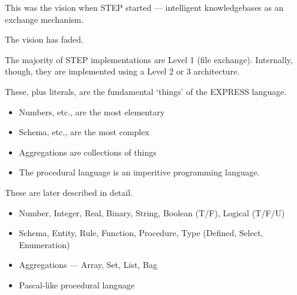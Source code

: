 \begin{remarks}
\remintro


   This was the vision when STEP started --- intelligent knowledgebases as
an exchange mechanism.

   The vision has faded.

    The majority of STEP implementations are Level 1 (file exchange). 
Internally, though, they are implemented using a Level 2 or 3 architecture.

\remend
\end{remarks}

\normalsize
%
%
%
%
\begin{figure}[hp]
\centering

\end{figure}
\bodsiz


\begin{remarks}
\remintro
{}

These, plus literals, are the fundamental `things' of the EXPRESS language.

\begin{itemize}
\item Numbers, etc., are the most elementary

\item Schema, etc., are the most complex

\item Aggregations are collections of things

\item The procedural language is an imperitive programming language.

\end{itemize}

    These are later described in detail.

\remend
\end{remarks}



\begin{itemize}
\item Number, Integer, Real, Binary, String, Boolean (T/F), Logical (T/F/U)

\item Schema, Entity, Rule, Function, Procedure, Type (Defined, Select,
      Enumeration)

\item Aggregations --- Array, Set, List, Bag

\item Pascal-like procedural language
\end{itemize}

